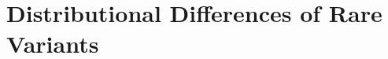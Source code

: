 \documentclass[header.tex]{subfiles}
\begin{document}
\chapter{Distributional Differences of Rare Variants}
\label{cha:distribuional_differences_of_rare_variants}




\printbibliography[heading=subbibliography]
\end{document}
